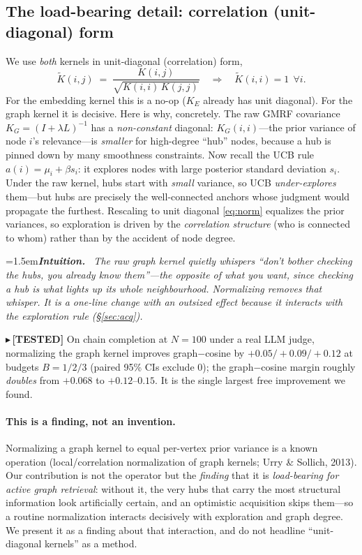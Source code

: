 \documentclass[11pt]{article}
\newcommand{\TESTED}[1]{{\color{teal}\small$\blacktriangleright$\,\textbf{[TESTED]} #1}}
\newenvironment{intuition}{\par\smallskip\noindent\hangindent=1.5em\textbf{\itshape Intuition.}\itshape\ \ignorespaces}{\par\smallskip}
\newcommand{\Kt}{\widetilde{K}}
\begin{document}
\subsection{The load-bearing detail: correlation (unit-diagonal) form}
We use \emph{both} kernels in unit-diagonal (correlation) form,
\begin{equation}\label{eq:norm}
  \Kt(i,j) \;=\; \frac{K(i,j)}{\sqrt{K(i,i)\,K(j,j)}} \quad\Longrightarrow\quad \Kt(i,i)=1\ \ \forall i.
\end{equation}
For the embedding kernel this is a no-op ($K_E$ already has unit diagonal). For the graph kernel it is decisive.
Here is why, concretely. The raw GMRF covariance $K_G=(I+\lambda L)^{-1}$ has a \emph{non-constant} diagonal:
$K_G(i,i)$---the prior variance of node $i$'s relevance---is \emph{smaller} for high-degree ``hub'' nodes,
because a hub is pinned down by many smoothness constraints. Now recall the UCB rule
$a(i)=\mu_i+\beta s_i$: it explores nodes with large posterior standard deviation $s_i$. Under the raw kernel,
hubs start with \emph{small} variance, so UCB \emph{under-explores} them---but hubs are precisely the
well-connected anchors whose judgment would propagate the furthest. Rescaling to unit diagonal
\eqref{eq:norm} equalizes the prior variances, so exploration is driven by the \emph{correlation structure}
(who is connected to whom) rather than by the accident of node degree.

\begin{intuition}
The raw graph kernel quietly whispers ``don't bother checking the hubs, you already know them''---the opposite
of what you want, since checking a hub is what lights up its whole neighbourhood. Normalizing removes that
whisper. It is a one-line change with an outsized effect because it interacts with the exploration rule
(\S\ref{sec:acq}).
\end{intuition}
\TESTED{On chain completion at $N{=}100$ under a real LLM judge, normalizing the graph kernel improves
graph$-$cosine by $+0.05/+0.09/+0.12$ at budgets $B{=}1/2/3$ (paired 95\% CIs exclude 0); the graph$-$cosine
margin roughly \emph{doubles} from $+0.068$ to $+0.12$--$0.15$. It is the single largest free improvement we found.}

\paragraph{This is a finding, not an invention.} Normalizing a graph kernel to equal per-vertex prior variance
is a known operation (local/correlation normalization of graph kernels; Urry \& Sollich, 2013). Our contribution
is not the operator but the \emph{finding} that it is \emph{load-bearing for active graph retrieval}: without it,
the very hubs that carry the most structural information look artificially certain, and an optimistic acquisition
skips them---so a routine normalization interacts decisively with exploration and graph degree. We present it as
a finding about that interaction, and do not headline ``unit-diagonal kernels'' as a method.
\end{document}
